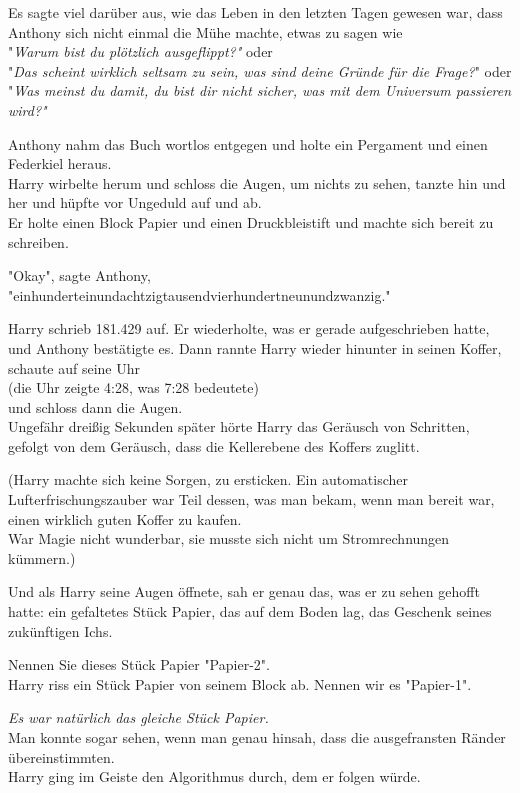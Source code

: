 {Es sagte viel darüber aus, wie das Leben in den letzten Tagen gewesen war, dass Anthony sich nicht einmal die Mühe machte, etwas zu sagen wie\\ "\emph{Warum bist du plötzlich ausgeflippt?"} oder\\ "\emph{Das scheint wirklich seltsam zu sein, was sind deine Gründe für die Frage?}" oder\\ "\emph{Was meinst du damit, du bist dir nicht sicher, was mit dem Universum passieren wird?"}

Anthony nahm das Buch wortlos entgegen und holte ein Pergament und einen Federkiel heraus.\\ Harry wirbelte herum und schloss die Augen, um nichts zu sehen, tanzte hin und her und hüpfte vor Ungeduld auf und ab.\\ Er holte einen Block Papier und einen Druckbleistift und machte sich bereit zu schreiben.

"Okay", sagte Anthony, "einhunderteinundachtzigtausendvierhundertneunundzwanzig."

Harry schrieb 181.429 auf. Er wiederholte, was er gerade aufgeschrieben hatte, und Anthony bestätigte es. Dann rannte Harry wieder hinunter in seinen Koffer, schaute auf seine Uhr\\ (die Uhr zeigte 4:28, was 7:28 bedeutete)\\ und schloss dann die Augen.\\ Ungefähr dreißig Sekunden später hörte Harry das Geräusch von Schritten, gefolgt von dem Geräusch, dass die Kellerebene des Koffers zuglitt.

(Harry machte sich keine Sorgen, zu ersticken. Ein automatischer Lufterfrischungszauber war Teil dessen, was man bekam, wenn man bereit war, einen wirklich guten Koffer zu kaufen.\\ War Magie nicht wunderbar, sie musste sich nicht um Stromrechnungen kümmern.)

Und als Harry seine Augen öffnete, sah er genau das, was er zu sehen gehofft hatte: ein gefaltetes Stück Papier, das auf dem Boden lag, das Geschenk seines zukünftigen Ichs.

Nennen Sie dieses Stück Papier "Papier-2".\\ Harry riss ein Stück Papier von seinem Block ab. Nennen wir es "Papier-1".

\emph{Es war natürlich das gleiche Stück Papier.}\\ Man konnte sogar sehen, wenn man genau hinsah, dass die ausgefransten Ränder übereinstimmten.\\ Harry ging im Geiste den Algorithmus durch, dem er folgen würde.

}
